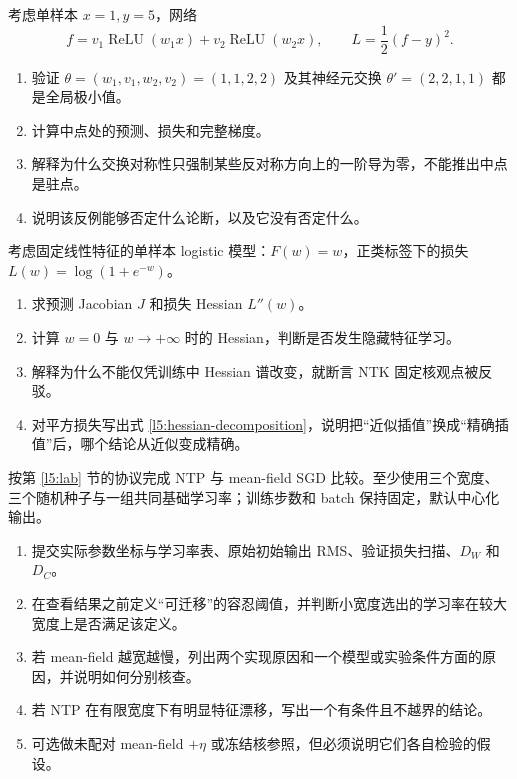 \begin{exercise}[对称极小值的中点反例]
考虑单样本 $x=1,y=5$，网络
\[
 f=v_1\operatorname{ReLU}(w_1x)+v_2\operatorname{ReLU}(w_2x),
 \qquad L=\frac12(f-y)^2.
\]
\begin{enumerate}
 \item 验证 $\theta=(w_1,v_1,w_2,v_2)=(1,1,2,2)$ 及其神经元交换
$\theta'=(2,2,1,1)$ 都是全局极小值。
 \item 计算中点处的预测、损失和完整梯度。
 \item 解释为什么交换对称性只强制某些反对称方向上的一阶导为零，不能推出中点是驻点。
 \item 说明该反例能够否定什么论断，以及它没有否定什么。
\end{enumerate}
\end{exercise}

\begin{exercise}
考虑固定线性特征的单样本 logistic 模型：$F(w)=w$，正类标签下的损失
$L(w)=\log(1+e^{-w})$。
\begin{enumerate}
 \item 求预测 Jacobian $J$ 和损失 Hessian $L''(w)$。
 \item 计算 $w=0$ 与 $w\to+\infty$ 时的 Hessian，判断是否发生隐藏特征学习。
 \item 解释为什么不能仅凭训练中 Hessian 谱改变，就断言 NTK 固定核观点被反驳。
 \item 对平方损失写出式 \eqref{l5:hessian-decomposition}，说明把“近似插值”换成“精确插值”后，哪个结论从近似变成精确。
\end{enumerate}
\end{exercise}

\begin{exercise}[一份可复核的宽度迁移报告]
按第 \ref{l5:lab} 节的协议完成 NTP 与 mean-field SGD 比较。至少使用三个宽度、三个随机种子与一组共同基础学习率；训练步数和 batch 保持固定，默认中心化输出。
\begin{enumerate}
 \item 提交实际参数坐标与学习率表、原始初始输出 RMS、验证损失扫描、$D_W$ 和 $D_C$。
 \item 在查看结果之前定义“可迁移”的容忍阈值，并判断小宽度选出的学习率在较大宽度上是否满足该定义。
 \item 若 mean-field 越宽越慢，列出两个实现原因和一个模型或实验条件方面的原因，并说明如何分别核查。
 \item 若 NTP 在有限宽度下有明显特征漂移，写出一个有条件且不越界的结论。
 \item 可选做未配对 mean-field $+\eta$ 或冻结核参照，但必须说明它们各自检验的假设。
\end{enumerate}
\end{exercise}

